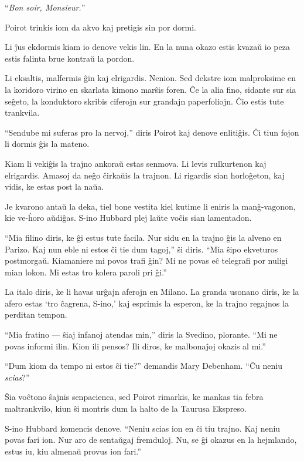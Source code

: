 ``\emph{Bon soir, Monsieur.}''

Poirot trinkis iom da akvo kaj pretigis sin por dormi.

\sectionbreak

Li ĵus ekdormis kiam io denove vekis lin. En la nuna okazo estis kvazaŭ io peza estis falinta brue kontraŭ la pordon.

Li eksaltis, malfermis ĝin kaj elrigardis. Nenion. Sed dekstre iom malproksime en la koridoro virino en skarlata kimono marŝis foren. Ĉe la alia fino, sidante sur sia seĝeto, la konduktoro skribis ciferojn sur grandajn paperfoliojn. Ĉio estis tute trankvila.

``Sendube mi suferas pro la nervoj,'' diris Poirot kaj denove enlitiĝis. Ĉi tiun fojon li dormis ĝis la mateno.

\sectionbreak

Kiam li vekiĝis la trajno ankoraŭ estas senmova. Li levis rulkurtenon kaj elrigardis. Amasoj da neĝo ĉirkaŭis la trajnon. Li rigardis sian horloĝeton, kaj vidis, ke estas post la naŭa.

Je kvarono antaŭ la deka, tiel bone vestita kiel kutime li eniris la manĝ-vagonon, kie ve-ĥoro aŭdiĝas. S-ino Hubbard plej laŭte voĉis sian lamentadon.

``Mia filino diris, ke ĝi estus tute facila. Nur sidu en la trajno ĝis la alveno en Parizo. Kaj nun eble ni estos ĉi tie dum tagoj,'' ŝi diris. ``Mia ŝipo ekveturos postmorgaŭ. Kiamaniere mi povos trafi ĝin? Mi ne povas eĉ telegrafi por nuligi mian lokon. Mi estas tro kolera paroli pri ĝi.''

La italo diris, ke li havas urĝajn aferojn en Milano. La granda usonano diris, ke la afero estas `tro ĉagrena, S-ino,' kaj esprimis la esperon, ke la trajno regajnos la perditan tempon.

``Mia fratino --- ŝiaj infanoj atendas min,'' diris la Svedino, plorante. ``Mi ne povas informi ilin. Kion ili pensos? Ili diros, ke malbonaĵoj okazis al mi.''

``Dum kiom da tempo ni estos ĉi tie?'' demandis Mary Debenham. ``Ĉu neniu \emph{scias}?''

Ŝia voĉtono ŝajnis senpacienca, sed Poirot rimarkis, ke mankas tia febra maltrankvilo, kiun ŝi montris dum la halto de la Taurusa Ekspreso.

S-ino Hubbard komencis denove. ``Neniu scias ion en ĉi tiu trajno. Kaj neniu povas fari ion. Nur aro de sentaŭgaj fremduloj. Nu, se ĝi okazus en la hejmlando, estus iu, kiu almenaŭ provus ion fari.''

